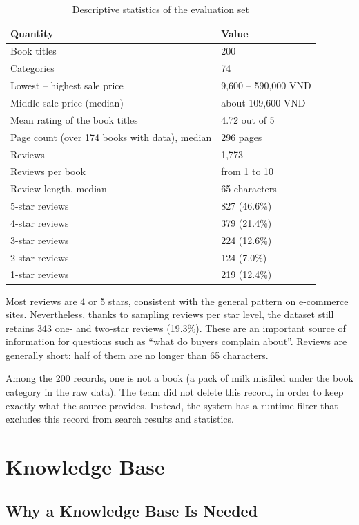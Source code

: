 \begin{table}[!htbp]
\caption{Descriptive statistics of the evaluation set}
\label{tab:mo-ta}
\cobang
\begin{tabularx}{\linewidth}{YR{5.4cm}}
\toprule
\textbf{Quantity} & \textbf{Value}\\
\midrule
Book titles & 200\\
Categories & 74\\
Lowest -- highest sale price & 9,600 -- 590,000 VND\\
Middle sale price (median) & about 109,600 VND\\
Mean rating of the book titles & 4.72 out of 5\\
Page count (over 174 books with data), median & 296 pages\\
\midrule
Reviews & 1,773\\
Reviews per book & from 1 to 10\\
Review length, median & 65 characters\\
5-star reviews & 827 (46.6\%)\\
4-star reviews & 379 (21.4\%)\\
3-star reviews & 224 (12.6\%)\\
2-star reviews & 124 (7.0\%)\\
1-star reviews & 219 (12.4\%)\\
\bottomrule
\end{tabularx}
\end{table}

Most reviews are 4 or 5 stars, consistent with the general pattern on e-commerce sites. Nevertheless, thanks to sampling reviews per star level, the dataset still retains 343 one- and two-star reviews (19.3\%). These are an important source of information for questions such as ``what do buyers complain about''. Reviews are generally short: half of them are no longer than 65 characters.

Among the 200 records, one is not a book (a pack of milk misfiled under the book category in the raw data). The team did not delete this record, in order to keep exactly what the source provides. Instead, the system has a runtime filter that excludes this record from search results and statistics.

\section{Knowledge Base}
\label{sec:kho-tri-thuc}

\subsection{Why a Knowledge Base Is Needed}


